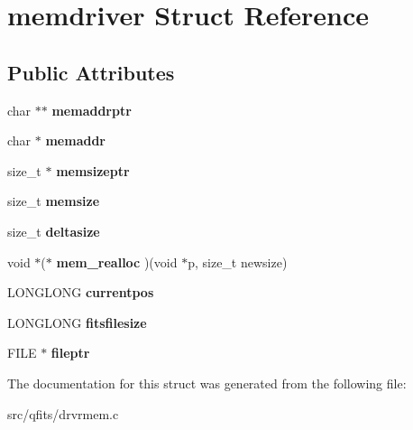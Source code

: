 \hypertarget{structmemdriver}{}\section{memdriver Struct Reference}
\label{structmemdriver}
\subsection*{Public Attributes}
\begin{DoxyCompactItemize}
\item 
\mbox{\label{structmemdriver_a5a6bcabb62cf2fa28ddc489192190ea8}} 
char $\ast$$\ast$ {\bfseries memaddrptr}
\item 
\mbox{\label{structmemdriver_a70af4087ce623a50dd7a48a6abbf07d5}} 
char $\ast$ {\bfseries memaddr}
\item 
\mbox{\label{structmemdriver_a234a4fd3b6c084c90357bd6fa8db6116}} 
size\+\_\+t $\ast$ {\bfseries memsizeptr}
\item 
\mbox{\label{structmemdriver_a8389e550abf475a124dd65772baf80d5}} 
size\+\_\+t {\bfseries memsize}
\item 
\mbox{\label{structmemdriver_ab4bb8ae3b57f1feb101dc90239100be4}} 
size\+\_\+t {\bfseries deltasize}
\item 
\mbox{\label{structmemdriver_afb8c562faab3a92f84260eee8261ee88}} 
void $\ast$($\ast$ {\bfseries mem\+\_\+realloc} )(void $\ast$p, size\+\_\+t newsize)
\item 
\mbox{\label{structmemdriver_a60d43618df2989fcd029135de079e204}} 
L\+O\+N\+G\+L\+O\+NG {\bfseries currentpos}
\item 
\mbox{\label{structmemdriver_af7de218361974bfd91edb83f7448a556}} 
L\+O\+N\+G\+L\+O\+NG {\bfseries fitsfilesize}
\item 
\mbox{\label{structmemdriver_a09f7102a585b577d73546e4deb275899}} 
F\+I\+LE $\ast$ {\bfseries fileptr}
\end{DoxyCompactItemize}


The documentation for this struct was generated from the following file\+:\begin{DoxyCompactItemize}
\item 
src/qfits/drvrmem.\+c\end{DoxyCompactItemize}
